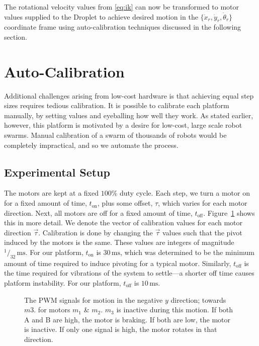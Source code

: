 \documentclass[letterpaper, 10pt, conference]{ieeeconf}
\begin{document}
The rotational velocity values from \eqref{eq:ik} can now be transformed to motor values supplied to the Droplet to achieve desired motion in the $\{\dot{x}_r, \dot{y}_r, \dot{\theta}_r\}$ coordinate frame using auto-calibration techniques discussed in the following section.




\section{Auto-Calibration}
Additional challenges arising from low-cost hardware is that achieving equal step sizes requires tedious calibration.
It is possible to calibrate each platform manually, by setting values and eyeballing how well they work. As stated earlier, however, this platform is motivated by a desire for low-cost, large scale robot swarms.  Manual calibration of a swarm of thousands of robots would be completely impractical, and so we automate the process.

\subsection{Experimental Setup}
The motors are kept at a fixed $100\%$ duty cycle. Each step, we turn a motor on for a fixed amount of time, $t_{\text{on}}$, plus some offset, $\tau$,  which varies for each motor direction. Next, all motors are off for a fixed amount of time, $t_{\text{off}}$. Figure~\ref{fig:pwmSignals} shows this in more detail. We denote the vector of calibration values for each motor direction $\vec{\tau}$. Calibration is done by changing the $\vec{\tau}$ values such that the pivot induced by the motors is the same. These values are integers of magnitude $^1/_{32}\,\mathrm{ms}$. For our platform, $t_{\text{on}}$ is $30\,\mathrm{ms}$, which was determined to be the minimum amount of time required to induce pivoting for a typical motor. Similarly, $t_{\text{off}}$ is the time required for vibrations of the system to settle---a shorter off time causes platform instability. For our platform, $t_{\text{off}}$ is $10\,\mathrm{ms}$.

\begin{figure}[!htb]
\centering

\caption{The PWM signals for motion in the negative $y$ direction; towards $m3$. for motors $m_1$ \& $m_2$. $m_3$ is inactive during this motion. If both A and B are high, the motor is braking. If both are low, the motor is inactive. If only one signal is high, the motor rotates in that direction.}
\label{fig:pwmSignals}
\end{figure}
\end{document}
